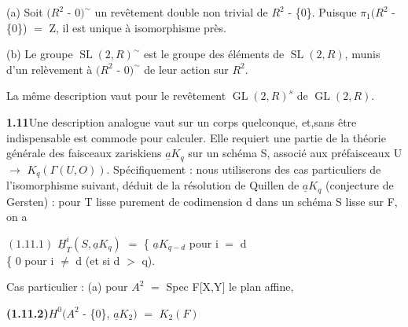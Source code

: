 \documentclass[10pt,a4paper]{article}
\begin{document}
\par (a) Soit $(R^2$ - ${0})^\sim$ un revêtement double non trivial de $R^2$ - \{0\}. Puisque $\pi{}_1(R^2$ - \{0\}) $=$ Z, il est unique à isomorphisme près.\par
\par (b) Le groupe $\operatorname{SL}(2,R)^\sim$ est le groupe des éléments de $\operatorname{SL}(2,R)$, munis d'un relèvement à $(R^2$ - ${0})^\sim$ de leur action sur $R^2$.\par
\par La même description vaut pour le revêtement $\operatorname{GL}(2,R)^s$ de $\operatorname{GL}(2,R)$.\par
\par\noindent\textbf{1.11}\quad Une description analogue vaut sur un corps quelconque, et,sans être indispensable est commode pour calculer. Elle requiert une partie de la théorie générale des faisceaux zariskiens $\underline{a}K_q$ sur un schéma S, associé aux préfaisceaux U $\to{}$ $K_q(\Gamma{}(U,O))$. Spécifiquement : nous utiliserons des cas particuliers de l'isomorphisme suivant, déduit de la résolution de Quillen de $\underline{a}K_q$ (conjecture de Gersten) : pour T lisse purement de codimension d dans un schéma S lisse sur F, on a\par
\par\smallskip\begin{center}\begin{minipage}{0.96\textwidth}\centering
$(1.11.1)$ $\underline{H}_T^i(S,\underline{a}K_q)$ $=$ \{ $\underline{a}K_{q-d}$ pour i $=$ d \\ \{ 0 pour i $\ne{}$ d (et si d $>$ q).
\end{minipage}\end{center}\smallskip
\par Cas particulier : (a) pour $A^2$ $=$ Spec F[X,Y] le plan affine,\par
\par\noindent\textbf{(1.11.2)}\quad $H^0(A^2$ - \{0\}, $\underline{a}K_2)$ $=$ $K_2(F)$\par
\end{document}
